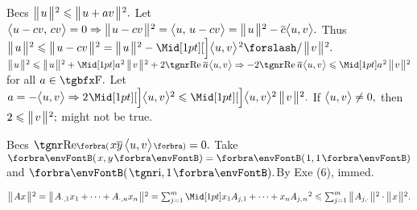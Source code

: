 Becs $\big\Vert\hspace{1pt}{}u{}\hspace{1pt}\big\Vert{\hspace{0.5pt}}{^2}\leqslant\big\Vert\hspace{1pt}{}u+av{}\hspace{1pt}\big\Vert{\hspace{0.5pt}}{^2}.$ Let $\big\langle{}u-cv,\,cv{}\big\rangle=0\Rightarrow\big\Vert\hspace{1pt}{}u-cv{}\hspace{1pt}\big\Vert{\hspace{0.5pt}}{^2}=\big\langle{}u,\,u-cv{}\big\rangle=\big\Vert\hspace{1pt}{}u{}\hspace{1pt}\big\Vert{\hspace{0.5pt}}{^2}-\overline{c}\big\langle{}u,v{}\big\rangle.$\parSol{}
Thus $\Dvertsq{u}\leqslant\Dvertsq{u-cv}=\Dvertsq{u}-\innerAsq{u,v}{\;\!\XSlash\;\!}\Dvertsq{v}.$\PfEnd\vspace{4pt}\parSol{}
\Or $\Dvertsq{u}\leqslant\Dvertsq{u}+\aMidsq{a}\,\Dvertsq{v}+2\REAL\:\overline{a}\:\!\Ang{u,v}\Rightarrow-2\REAL\:\overline{a}\:\!\Ang{u,v}\leqslant\aMidsq{a}\,\Dvertsq{v}$ for all $a\in\Fbb.$\parSol{}
Let $a=-\Ang{u,v}\Rightarrow2\:\!\innerA{u,v}{^2}\leqslant\innerA{u,v}{^2}\,\Dvertsq{v}.$ If $\big\langle{}u,v{}\big\rangle\neq0,$ then $2\leqslant\big\Vert\hspace{1pt}{}v{}\hspace{1pt}\big\Vert{\hspace{0.5pt}}{^2};$ might not be true.\PfEnd
\SepLine

Becs $\REAL\BigPar{x\overline{y}\,\Ang{u,v}}=0.$ Take $\Par{x,y}=\Par{1,1}$ and $\Par{\i,1}.$\quad\Or By Exe (6), immed.\PfEnd
\SepLine


$\Dvertsq{Ax}=\Dvertsq{A_{\cdot,1}x_1+\dots+A_{\cdot,n}x_n}=\sum_{j=1}^m\aMidsq{x_1A_{j,1}+\dots+x_nA_{j,\;\!n}}\leqslant\sum_{j=1}^m\Dvertsq{A_{j,\cdot}}\cdot\Dvertsq{x}.$\PfEnd
\SepLine

